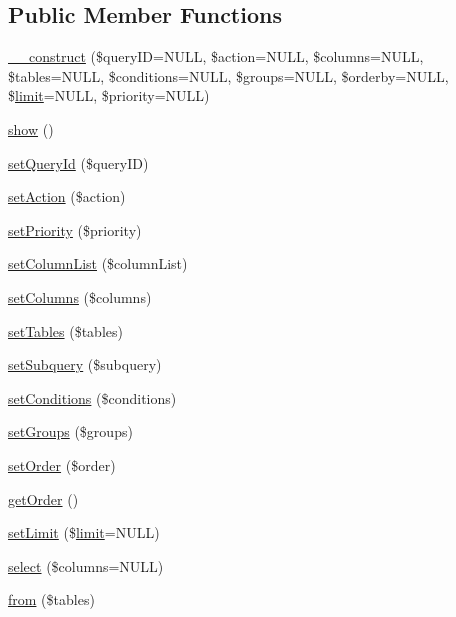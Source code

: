 \subsection*{Public Member Functions}
\begin{DoxyCompactItemize}
\item 
\hyperlink{classQuery_a6dbf3be72bbd9a240e408e5056353349}{\-\_\-\-\_\-construct} (\$query\-I\-D=N\-U\-L\-L, \$action=N\-U\-L\-L, \$columns=N\-U\-L\-L, \$tables=N\-U\-L\-L, \$conditions=N\-U\-L\-L, \$groups=N\-U\-L\-L, \$orderby=N\-U\-L\-L, \$\hyperlink{classQuery_af2e290d02d3e8c157f9b85b9da1ac08c}{limit}=N\-U\-L\-L, \$priority=N\-U\-L\-L)
\item 
\hyperlink{classQuery_ab191941325776f3475aeea910167a116}{show} ()
\item 
\hyperlink{classQuery_aad02b39cd751359208514261f7d320d3}{set\-Query\-Id} (\$query\-I\-D)
\item 
\hyperlink{classQuery_a7039862d8a88c94733b4ffabd655ade6}{set\-Action} (\$action)
\item 
\hyperlink{classQuery_a6bb27fe96006304e408d51171301c4b9}{set\-Priority} (\$priority)
\item 
\hyperlink{classQuery_a514b84890d27f9252a9002f562b17654}{set\-Column\-List} (\$column\-List)
\item 
\hyperlink{classQuery_a2437f6f8524dfc487794270a11778388}{set\-Columns} (\$columns)
\item 
\hyperlink{classQuery_a883baff577719a7108a3acc202d2db00}{set\-Tables} (\$tables)
\item 
\hyperlink{classQuery_a98af3910bfaf6ed001572c954f28e1a5}{set\-Subquery} (\$subquery)
\item 
\hyperlink{classQuery_a5355ddd61a8e4dc129f5f3dd24d39bc9}{set\-Conditions} (\$conditions)
\item 
\hyperlink{classQuery_ab32d5ecb27ebf9facac7ba9c28fc22f6}{set\-Groups} (\$groups)
\item 
\hyperlink{classQuery_a712d4ae76fa0efafa198d2e1fe23a222}{set\-Order} (\$order)
\item 
\hyperlink{classQuery_a41f8624567819ead73e5b57935e526c7}{get\-Order} ()
\item 
\hyperlink{classQuery_a16a55fd5666868a39a7a93f7b98d4de0}{set\-Limit} (\$\hyperlink{classQuery_af2e290d02d3e8c157f9b85b9da1ac08c}{limit}=N\-U\-L\-L)
\item 
\hyperlink{classQuery_a90a4c6f16abc24f107cd9cbc8db6baea}{select} (\$columns=N\-U\-L\-L)
\item 
\hyperlink{classQuery_a8c48087275e1fb408298c5c6295bbf20}{from} (\$tables)

\end{DoxyCompactItemize}
